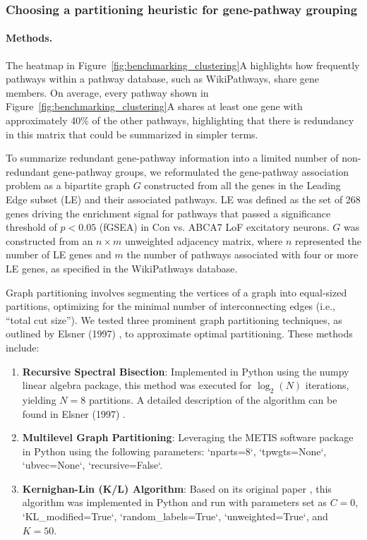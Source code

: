 \subsubsection{Choosing a partitioning heuristic for gene-pathway grouping}
\paragraph{Methods.}
The heatmap in Figure~\ref{fig:benchmarking_clustering}A highlights how frequently pathways within a pathway database, such as WikiPathways, share gene members. On average, every pathway shown in Figure~\ref{fig:benchmarking_clustering}A shares at least one gene with approximately 40\% of the other pathways, highlighting that there is redundancy in this matrix that could be summarized in simpler terms.

To summarize redundant gene-pathway information into a limited number of non-redundant gene-pathway groups, we reformulated the gene-pathway association problem as a bipartite graph $G$ constructed from all the genes in the Leading Edge subset (LE) and their associated pathways. LE was defined as the set of 268 genes driving the enrichment signal for pathways that passed a significance threshold of $p < 0.05$ (fGSEA) in Con vs. ABCA7 LoF excitatory neurons. $G$ was constructed from an $n \times m$ unweighted adjacency matrix, where $n$ represented the number of LE genes and $m$ the number of pathways associated with four or more LE genes, as specified in the WikiPathways database.

Graph partitioning involves segmenting the vertices of a graph into equal-sized partitions, optimizing for the minimal number of interconnecting edges (i.e., “total cut size”). We tested three prominent graph partitioning techniques, as outlined by Elsner (1997) \cite{Elsner1997GraphPartitioning}, to approximate optimal partitioning. These methods include:

\begin{enumerate}
    \item \textbf{Recursive Spectral Bisection}: Implemented in Python using the numpy linear algebra package, this method was executed for $\log_2(N)$ iterations, yielding $N = 8$ partitions. A detailed description of the algorithm can be found in Elsner (1997) \cite{Elsner1997GraphPartitioning}.
    \item \textbf{Multilevel Graph Partitioning}: Leveraging the METIS software package \cite{Karypis1997METIS} in Python using the following parameters: `nparts=8`, `tpwgts=None`, `ubvec=None`, `recursive=False`.
    \item \textbf{Kernighan-Lin (K/L) Algorithm}: Based on its original paper \cite{Kernighan1970-zl}, this algorithm was implemented in Python and run with parameters set as $C=0$, `KL\_modified=True`, `random\_labels=True`, `unweighted=True`, and $K=50$.
\end{enumerate}

